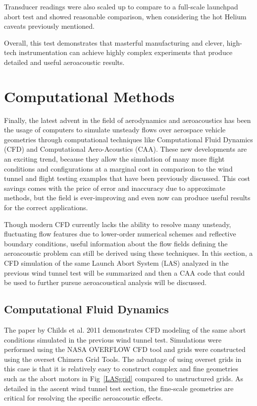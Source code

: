 \documentclass[]{aiaa-tc}%
\begin{document}
Transducer readings were also scaled up to compare to a full-scale launchpad abort test and showed reasonable comparison, when considering the hot Helium caveats previously mentioned.

Overall, this test demonstrates that masterful manufacturing and clever, high-tech instrumentation can achieve highly complex experiments that produce detailed and useful aeroacoustic results.



\section{Computational Methods}

Finally, the latest advent in the field of aerodynamics and aeroacoustics has been the usage of computers to simulate unsteady flows over aerospace vehicle geometries through computational techniques like Computational Fluid Dynamics (CFD) and Computational Aero-Acoustics (CAA).  These new developments are an exciting trend, because they allow the simulation of many more flight conditions and configurations at a marginal cost in comparison to the wind tunnel and flight testing examples that have been previously discussed.  This cost savings comes with the price of error and inaccuracy due to approximate methods, but the field is ever-improving and even now can produce useful results for the correct applications.

Though modern CFD currently lacks the ability to resolve many unsteady, fluctuating flow features due to lower-order numerical schemes and reflective boundary conditions, useful information about the flow fields defining the aeroacoustic problem can still be derived using these techniques.  In this section, a CFD simulation of the same Launch Abort System (LAS) analyzed in the previous wind tunnel test will be summarized and then a CAA code that could be used to further pursue aeroacoustical analysis will be discussed.

\subsection{Computational Fluid Dynamics}

The paper by Childs et al. 2011 \cite{OverflowOrionAbortGuidelines} demonstrates CFD modeling of the same abort conditions simulated in the previous wind tunnel test.  Simulations were performed using the NASA OVERFLOW CFD tool and grids were constructed using the overset Chimera Grid Tools.  The advantage of using overset grids in this case is that it is relatively easy to construct complex and fine geometries such as the abort motors in Fig~\ref{LASgrid} compared to unstructured grids.  As detailed in the ascent wind tunnel test section, the fine-scale geometries are critical for resolving the specific aeroacoustic effects.
\end{document}
